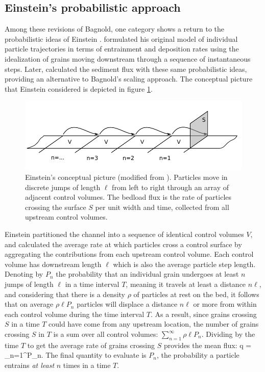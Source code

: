 \subsection{Einstein's probabilistic approach}
\label{sec:einflux}

Among these revisions of Bagnold, one category shows a return to the probabilistic ideas of Einstein \citep{Parker2003,Ancey2006}.
\citet{Einstein1937} formulated his original model of individual particle trajectories in terms of entrainment and deposition rates using the idealization of grains moving downstream through a sequence of instantaneous steps.
Later, \citet{Einstein1942,Einstein1950} calculated the sediment flux with these same probabilistic ideas, providing an alternative to Bagnold's scaling approach.
The conceptual picture that Einstein considered is depicted in figure \ref{fig:einsteinFluxConcept}.
 \begin{figure}[!htbp]
	\includegraphics[width=\linewidth,keepaspectratio]{./figures/ch1/yalinDrawing.pdf}
	\caption{Einstein’s conceptual picture (modified from \citet{Yalin1972}). Particles move in discrete jumps of length $\ell$ from
left to right through an array of adjacent control volumes. The bedload flux is the rate of particles crossing
the surface $S$ per unit width and time, collected from all upstream control volumes.}
	\label{fig:einsteinFluxConcept}
\end{figure}

Einstein partitioned the channel into a sequence of identical control volumes $V$, and calculated the average rate at which particles cross a control surface by aggregating the contributions from each upstream control volume.
Each control volume has downstream length $\ell$ which is also the average particle step length.
Denoting by $P_n$ the probability that an individual grain undergoes at least $n$ jumps of length $\ell$ in a time interval $T$, meaning it travels at least a distance $n \ell$, and considering that there is a density $\rho$ of particles at rest on the bed, it follows that on average $\rho \ell P_n$ particles will displace a distance $n \ell$ or more from within each control volume during the time interval $T$. 
As a result, since grains crossing $S$ in a time $T$ could have come from any upstream location, the number of grains crossing $S$ in $T$ is a sum over all control volumes: $\sum_{n=1}^\infty \rho \ell P_n$.
Dividing by the time $T$ to get the average rate of grains crossing $S$ provides the mean flux:
\be q =  \sum_{n=1}^\infty P_n. \label{eq:einflux} \ee
The final quantity to evaluate is $P_n$, the probability a particle entrains \textit{at least} $n$ times in a time $T$.

